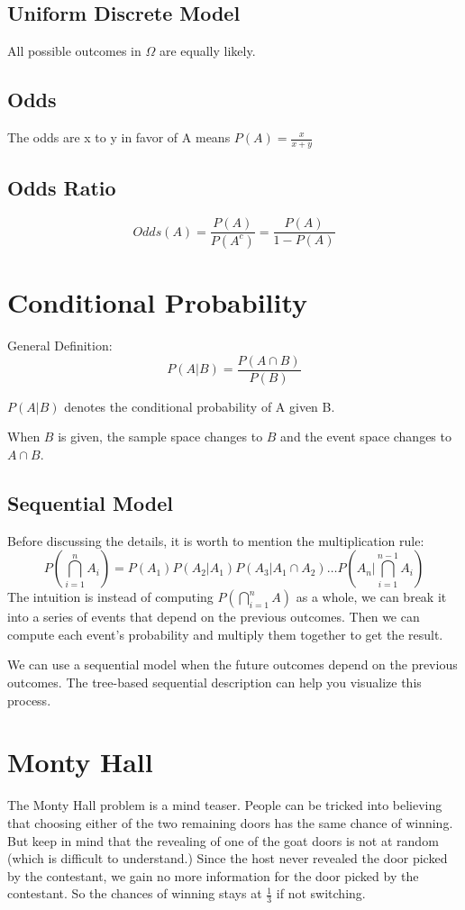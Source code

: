\documentclass[11pt]{article}
\begin{document}
\subsection{Uniform Discrete Model}
All possible outcomes in $\Omega$ are equally likely.

\subsection{Odds}
The odds are x to y in favor of A means $P(A) = \frac{x}{x+y}$

\subsection{Odds Ratio}
$$Odds(A) = \frac{P(A)}{P(A^c)} = \frac{P(A)}{1 - P(A)}$$

\section{Conditional Probability} 
General Definition:
$$P(A | B) = \frac{P(A \cap B)}{P(B)}$$

$P(A | B)$ denotes the conditional probability of A given B.

When $B$ is given, the sample space changes to $B$ and the event space changes to $A \cap B$. 

\subsection{Sequential Model}
Before discussing the details, it is worth to mention the multiplication rule:
$$P(\bigcap_{i=1}^{n} A_i) = P(A_1)P(A_2 | A_1)P(A_3 | A_1 \cap A_2) \ldots P(A_n | \bigcap_{i=1}^{n-1} A_{i})$$
The intuition is instead of computing $P(\bigcap_{i=1}^{n} A)$ as a whole, we can break it into a series of events that depend on the previous outcomes. 
Then we can compute each event's probability and multiply them together to get the result.

We can use a sequential model when the future outcomes depend on the previous outcomes. 
The tree-based sequential description can help you visualize this process.

\section{Monty Hall}
The Monty Hall problem is a mind teaser. 
People can be tricked into believing that choosing either of the two remaining doors has the same chance of winning.
But keep in mind that the revealing of one of the goat doors is not at random (which is difficult to understand.)
Since the host never revealed the door picked by the contestant, we gain no more information for the door picked by the contestant. 
So the chances of winning stays at $\frac{1}{3}$ if not switching.
\end{document}
